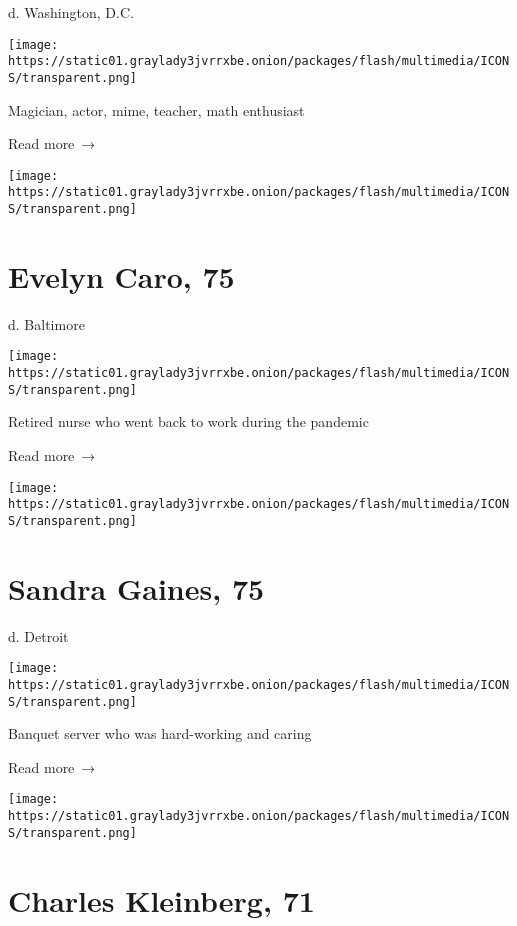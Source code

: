 d. Washington, D.C.

\texttt{[image: https://static01.graylady3jvrrxbe.onion/packages/flash/multimedia/ICONS/transparent.png]}

Magician, actor, mime, teacher, math enthusiast

 Read more~→

\href{https://www.nytimes3xbfgragh.onion/2020/06/08/obituaries/evelyn-caro-dead-coronavirus.html}{}

\texttt{[image: https://static01.graylady3jvrrxbe.onion/packages/flash/multimedia/ICONS/transparent.png]}

\hypertarget{evelyn-caro-75}{%
\section{Evelyn Caro, 75}\label{evelyn-caro-75}}

d. Baltimore

\texttt{[image: https://static01.graylady3jvrrxbe.onion/packages/flash/multimedia/ICONS/transparent.png]}

Retired nurse who went back to work during the pandemic

 Read more~→

\href{https://www.nytimes3xbfgragh.onion/2020/06/06/obituaries/sandra-gaines-dead-coronavirus.html}{}

\texttt{[image: https://static01.graylady3jvrrxbe.onion/packages/flash/multimedia/ICONS/transparent.png]}

\hypertarget{sandra-gaines-75}{%
\section{Sandra Gaines, 75}\label{sandra-gaines-75}}

d. Detroit

\texttt{[image: https://static01.graylady3jvrrxbe.onion/packages/flash/multimedia/ICONS/transparent.png]}

Banquet server who was hard-working and caring

 Read more~→

\href{https://www.nytimes3xbfgragh.onion/2020/06/05/obituaries/charles-kleinberg-dead-coronavirus.html}{}

\texttt{[image: https://static01.graylady3jvrrxbe.onion/packages/flash/multimedia/ICONS/transparent.png]}

\hypertarget{charles-kleinberg-71}{%
\section{Charles Kleinberg, 71}\label{charles-kleinberg-71}}

